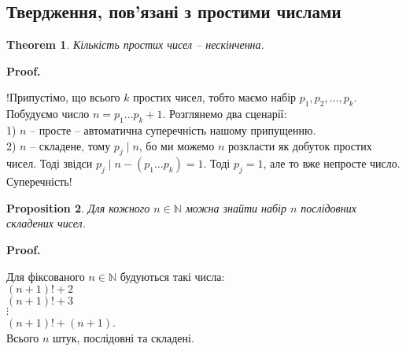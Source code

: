 \documentclass[a4paper, 14pt]{extarticle}
\makeatletter
\theoremstyle{theoremdd}
\newtheorem{theorem}{Theorem}[subsection]
\theoremstyle{theoremdd}
\theoremstyle{theoremdd}
\theoremstyle{theoremdd}
\theoremstyle{theoremdd}
\newtheorem{proposition}[theorem]{Proposition}
\theoremstyle{theoremdd}
\theoremstyle{theoremdd}
\theoremstyle{theoremdd}
\def\qed{$\blacksquare$}
\renewenvironment{proof}[1][Proof.\\]{\par
\pushQED{\hfill \qed}%
\normalfont \topsep6\p@\@plus6\p@\relax
\trivlist
\item\relax
{\bfseries
#1\@addpunct{.}}\hspace\labelsep\ignorespaces
}{%
\popQED\endtrivlist\@endpefalse
}
\makeatother
\begin{document}
\subsection{Твердження, пов'язані з простими числами}
\begin{theorem}
Кількість простих чисел -- нескінченна.
\end{theorem}

\begin{proof}
!Припустімо, що всього $k$ простих чисел, тобто маємо набір $p_1,p_2,\dots,p_k$. Побудуємо число $n = p_1 \dots p_k + 1$.  Розглянемо два сценарії:\\
1) $n$ -- просте -- автоматична суперечність нашому припущенню.\\
2) $n$ -- складене, тому $p_j \mid n$, бо ми можемо $n$ розкласти як добуток простих чисел. Тоді звідси $p_j \mid n - (p_1\dots p_k) = 1$. Тоді $p_j = 1$, але то вже непросте число. Суперечність!
\end{proof}

\iffalse
\begin{proof}
!Припустимо, що всього $k$ простих чисел, тобто маємо список $p_1,p_2,\dots,p_k$. Побудуємо число $m = \dfrac{1}{1-\dfrac{1}{p_1}} \dfrac{1}{1-\dfrac{1}{p_2}} \dots \dfrac{1}{1-\dfrac{1}{p_k}}$.\\
Скористаємось розкладом $\dfrac{1}{1-x} = 1+x+x^2+\dots$ - тоді звідси\\
$m = \left( 1 + \dfrac{1}{p_1} + \dfrac{1}{p_1^2} + \dots \right) \left( 1 + \dfrac{1}{p_2} + \dfrac{1}{p_2^2} + \dots \right) \dots \left( 1 + \dfrac{1}{p_k} + \dfrac{1}{p_k^2} + \dots \right) = \\
= 1 + \dfrac{1}{2} + \dfrac{1}{3} + \dfrac{1}{4} + \dots$\\
Ця рівність справедлива, згідно з основної теореми арифметики.\\
Отримали гармонічний ряд, що дорівнює якомусь числу. Суперечність!
\end{proof}
\fi

\begin{proposition}
Для кожного $n \in \mathbb{N}$ можна знайти набір $n$ послідовних складених чисел.
\end{proposition}

\begin{proof}
Для фіксованого $n \in \mathbb{N}$ будуються такі числа:\\
$(n+1)! + 2$\\
$(n+1)! + 3$\\
$\vdots$\\
$(n+1)! + (n+1)$.\\
Всього $n$ штук, послідовні та складені.
\end{proof}
\end{document}
